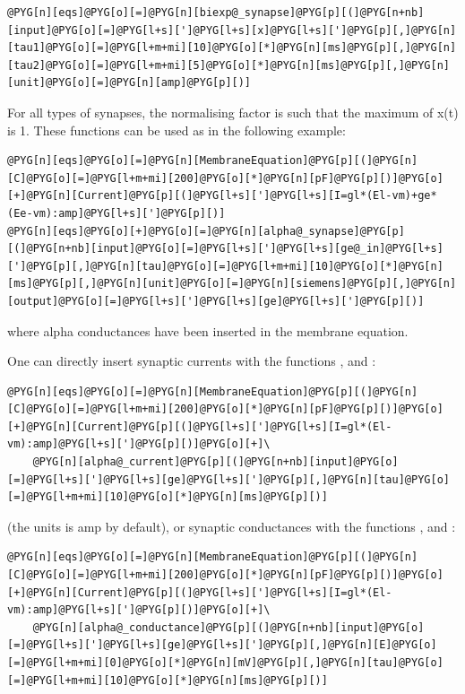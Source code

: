 \documentclass[letterpaper,10pt,english]{manual}
\begin{document}
\begin{Verbatim}[commandchars=@\[\]]
@PYG[n][eqs]@PYG[o][=]@PYG[n][biexp@_synapse]@PYG[p][(]@PYG[n+nb][input]@PYG[o][=]@PYG[l+s][']@PYG[l+s][x]@PYG[l+s][']@PYG[p][,]@PYG[n][tau1]@PYG[o][=]@PYG[l+m+mi][10]@PYG[o][*]@PYG[n][ms]@PYG[p][,]@PYG[n][tau2]@PYG[o][=]@PYG[l+m+mi][5]@PYG[o][*]@PYG[n][ms]@PYG[p][,]@PYG[n][unit]@PYG[o][=]@PYG[n][amp]@PYG[p][)]
\end{Verbatim}

For all types of synapses, the normalising factor is such that the maximum of x(t) is 1.
These functions can be used as in the following example:

\begin{Verbatim}[commandchars=@\[\]]
@PYG[n][eqs]@PYG[o][=]@PYG[n][MembraneEquation]@PYG[p][(]@PYG[n][C]@PYG[o][=]@PYG[l+m+mi][200]@PYG[o][*]@PYG[n][pF]@PYG[p][)]@PYG[o][+]@PYG[n][Current]@PYG[p][(]@PYG[l+s][']@PYG[l+s][I=gl*(El-vm)+ge*(Ee-vm):amp]@PYG[l+s][']@PYG[p][)]
@PYG[n][eqs]@PYG[o][+]@PYG[o][=]@PYG[n][alpha@_synapse]@PYG[p][(]@PYG[n+nb][input]@PYG[o][=]@PYG[l+s][']@PYG[l+s][ge@_in]@PYG[l+s][']@PYG[p][,]@PYG[n][tau]@PYG[o][=]@PYG[l+m+mi][10]@PYG[o][*]@PYG[n][ms]@PYG[p][,]@PYG[n][unit]@PYG[o][=]@PYG[n][siemens]@PYG[p][,]@PYG[n][output]@PYG[o][=]@PYG[l+s][']@PYG[l+s][ge]@PYG[l+s][']@PYG[p][)]
\end{Verbatim}

where alpha conductances have been inserted in the membrane equation.

One can directly insert synaptic currents with the functions , 
and :

\begin{Verbatim}[commandchars=@\[\]]
@PYG[n][eqs]@PYG[o][=]@PYG[n][MembraneEquation]@PYG[p][(]@PYG[n][C]@PYG[o][=]@PYG[l+m+mi][200]@PYG[o][*]@PYG[n][pF]@PYG[p][)]@PYG[o][+]@PYG[n][Current]@PYG[p][(]@PYG[l+s][']@PYG[l+s][I=gl*(El-vm):amp]@PYG[l+s][']@PYG[p][)]@PYG[o][+]\
    @PYG[n][alpha@_current]@PYG[p][(]@PYG[n+nb][input]@PYG[o][=]@PYG[l+s][']@PYG[l+s][ge]@PYG[l+s][']@PYG[p][,]@PYG[n][tau]@PYG[o][=]@PYG[l+m+mi][10]@PYG[o][*]@PYG[n][ms]@PYG[p][)]
\end{Verbatim}

(the units is amp by default), or synaptic conductances with the functions , 
and \code{biexp\_conductance}:

\begin{Verbatim}[commandchars=@\[\]]
@PYG[n][eqs]@PYG[o][=]@PYG[n][MembraneEquation]@PYG[p][(]@PYG[n][C]@PYG[o][=]@PYG[l+m+mi][200]@PYG[o][*]@PYG[n][pF]@PYG[p][)]@PYG[o][+]@PYG[n][Current]@PYG[p][(]@PYG[l+s][']@PYG[l+s][I=gl*(El-vm):amp]@PYG[l+s][']@PYG[p][)]@PYG[o][+]\
    @PYG[n][alpha@_conductance]@PYG[p][(]@PYG[n+nb][input]@PYG[o][=]@PYG[l+s][']@PYG[l+s][ge]@PYG[l+s][']@PYG[p][,]@PYG[n][E]@PYG[o][=]@PYG[l+m+mi][0]@PYG[o][*]@PYG[n][mV]@PYG[p][,]@PYG[n][tau]@PYG[o][=]@PYG[l+m+mi][10]@PYG[o][*]@PYG[n][ms]@PYG[p][)]
\end{Verbatim}
\end{document}

